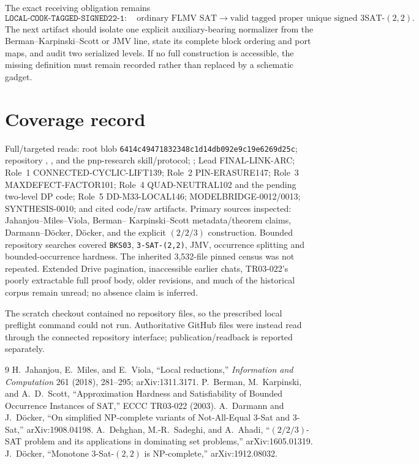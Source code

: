 \documentclass[11pt]{article}
\begin{document}
The exact receiving obligation remains
\[
 \texttt{LOCAL-COOK-TAGGED-SIGNED22-1}:
 \quad \text{ordinary FLMV SAT}\longrightarrow
 \text{valid tagged proper unique signed 3SAT-}(2,2).
\]
The next artifact should isolate one explicit auxiliary-bearing normalizer
from the Berman--Karpinski--Scott or JMV line, state its complete block
ordering and port maps, and audit two serialized levels.  If no full
construction is accessible, the missing definition must remain recorded
rather than replaced by a schematic gadget.

\section{Coverage record}

Full/targeted reads: root  blob
\texttt{6414c49471832348c1d14db092e9c19e6269d25c}; repository
, , and the pnp-research skill/protocol;
; Lead FINAL-LINK-ARC; Role~1 CONNECTED-CYCLIC-LIFT139;
Role~2 PIN-ERASURE147; Role~3 MAXDEFECT-FACTOR101; Role~4
QUAD-NEUTRAL102 and the pending two-level DP code; Role~5
DD-M33-LOCAL146; MODELBRIDGE-0012/0013; SYNTHESIS-0010; and cited code/raw
artifacts.  Primary sources inspected: Jahanjou--Miles--Viola, Berman--
Karpinski--Scott metadata/theorem claims, Darmann--D\"ocker, D\"ocker, and
the explicit $(2/2/3)$ construction.  Bounded repository searches covered
\texttt{BKS03}, \texttt{3-SAT-(2,2)}, JMV, occurrence splitting and
bounded-occurrence hardness.  The inherited 3,532-file pinned census was
not repeated.  Extended Drive pagination, inaccessible earlier chats,
TR03-022's poorly extractable full proof body, older revisions, and much of
the historical corpus remain unread; no absence claim is inferred.

The scratch checkout contained no repository files, so the prescribed local
preflight command could not run.  Authoritative GitHub files were instead
read through the connected repository interface; publication/readback is
reported separately.

\begin{thebibliography}{9}
 H.~Jahanjou, E.~Miles, and E.~Viola,
``Local reductions,'' \emph{Information and Computation} 261 (2018),
281--295; arXiv:1311.3171.
 P.~Berman, M.~Karpinski, and A.~D.~Scott,
``Approximation Hardness and Satisfiability of Bounded Occurrence Instances
of SAT,'' ECCC TR03-022 (2003).
 A.~Darmann and J.~D\"ocker,
``On simplified NP-complete variants of Not-All-Equal 3-Sat and 3-Sat,''
arXiv:1908.04198.
 A.~Dehghan, M.-R.~Sadeghi, and A.~Ahadi,
``$(2/2/3)$-SAT problem and its applications in dominating set problems,''
arXiv:1605.01319.
 J.~D\"ocker, ``Monotone 3-Sat-$(2,2)$ is NP-complete,''
arXiv:1912.08032.
\end{thebibliography}

\end{document}
